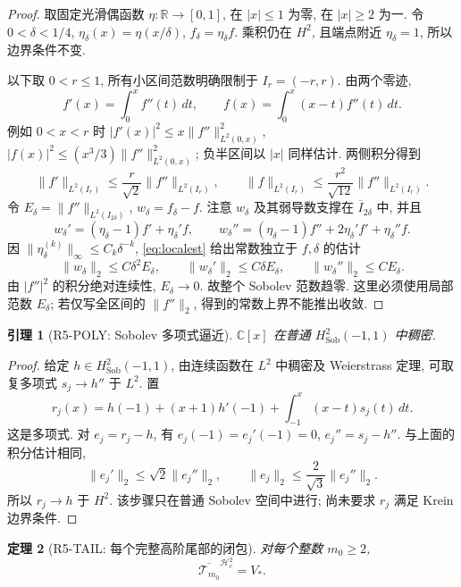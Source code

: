 \documentclass[UTF8,fontset=fandol,11pt,a4paper]{ctexart}
\newtheorem{theorem}{定理}[section]
\newtheorem{lemma}[theorem]{引理}
\theoremstyle{definition}
\newcommand{\C}{\mathbb C}
\newcommand{\Hs}{H^2_{\mathrm{Sob}}(-1,1)}
\newcommand{\Hc}{\mathcal H_c^2}
\newcommand{\norm}[1]{\lVert #1\rVert}
\begin{document}
\begin{proof}
取固定光滑偶函数 $\eta:\mathbb R\to[0,1]$, 在 $|x|\le1$ 为零,
在 $|x|\ge2$ 为一. 令 $0<\delta<1/4$,
$\eta_\delta(x)=\eta(x/\delta)$, $f_\delta=\eta_\delta f$.
乘积仍在 $H^2$, 且端点附近 $\eta_\delta=1$, 所以边界条件不变.

以下取 $0<r\le1$, 所有小区间范数明确限制于 $I_r=(-r,r)$.
由两个零迹,
\[
f'(x)=\int_0^x f''(t)\,dt,\qquad
f(x)=\int_0^x(x-t)f''(t)\,dt.
\]
例如 $0<x<r$ 时
$|f'(x)|^2\le x\norm{f''}_{L^2(0,x)}^2$,
$|f(x)|^2\le(x^3/3)\norm{f''}_{L^2(0,x)}^2$;
负半区间以 $|x|$ 同样估计. 两侧积分得到
\begin{equation}\label{eq:localest}
\norm{f'}_{L^2(I_r)}\le\frac r{\sqrt2}\norm{f''}_{L^2(I_r)},\qquad
\norm f_{L^2(I_r)}\le\frac{r^2}{\sqrt{12}}\norm{f''}_{L^2(I_r)}.
\end{equation}
令 $E_\delta=\norm{f''}_{L^2(I_{2\delta})}$,
$w_\delta=f_\delta-f$. 注意 $w_\delta$ 及其弱导数支撑在
$\overline I_{2\delta}$ 中, 并且
\[
w_\delta'=(\eta_\delta-1)f'+\eta_\delta'f,
\qquad
w_\delta''=(\eta_\delta-1)f''+2\eta_\delta'f'+\eta_\delta''f.
\]
因 $\norm{\eta_\delta^{(k)}}_\infty\le C_k\delta^{-k}$,
\eqref{eq:localest} 给出常数独立于 $f,\delta$ 的估计
\begin{equation}\label{eq:cutbound}
\norm{w_\delta}_2\le C\delta^2E_\delta,\qquad
\norm{w_\delta'}_2\le C\delta E_\delta,\qquad
\norm{w_\delta''}_2\le CE_\delta.
\end{equation}
由 $|f''|^2$ 的积分绝对连续性, $E_\delta\to0$.
故整个 Sobolev 范数趋零. 这里必须使用局部范数 $E_\delta$;
若仅写全区间的 $\norm{f''}_2$, 得到的常数上界不能推出收敛.
\end{proof}

\begin{lemma}[R5-POLY: Sobolev 多项式逼近]\label{lem:polyapprox}
$\C[x]$ 在普通 $\Hs$ 中稠密.
\end{lemma}

\begin{proof}
给定 $h\in\Hs$, 由连续函数在 $L^2$ 中稠密及 Weierstrass 定理,
可取复多项式 $s_j\to h''$ 于 $L^2$. 置
\[
r_j(x)=h(-1)+(x+1)h'(-1)+\int_{-1}^x(x-t)s_j(t)\,dt.
\]
这是多项式. 对 $e_j=r_j-h$, 有 $e_j(-1)=e_j'(-1)=0$,
$e_j''=s_j-h''$. 与上面的积分估计相同,
\[
\norm{e_j'}_2\le\sqrt2\norm{e_j''}_2,\qquad
\norm{e_j}_2\le\frac2{\sqrt3}\norm{e_j''}_2.
\]
所以 $r_j\to h$ 于 $H^2$. 该步骤只在普通 Sobolev 空间中进行;
尚未要求 $r_j$ 满足 Krein 边界条件.
\end{proof}

\begin{theorem}[R5-TAIL: 每个完整高阶尾部的闭包]\label{thm:tail}
对每个整数 $m_0\ge2$,
\begin{equation}\label{eq:tailclosure}
\boxed{\overline{\mathcal T_{m_0}}^{\Hc}=V_*.}
\end{equation}
\end{theorem}
\end{document}

